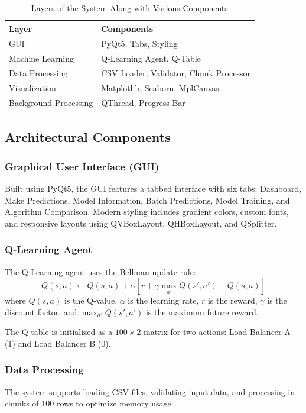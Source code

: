 \documentclass[runningheads]{llncs}
\begin{document}
\begin{table}[ht]
\caption{Layers of the System Along with Various Components}
\label{tab:layers}
\centering
\begin{tabular}{ll}
\toprule
\textbf{Layer} & \textbf{Components} \\
\midrule
GUI & PyQt5, Tabs, Styling \\
Machine Learning & Q-Learning Agent, Q-Table \\
Data Processing & CSV Loader, Validator, Chunk Processor \\
Visualization & Matplotlib, Seaborn, MplCanvas \\
Background Processing & QThread, Progress Bar \\
\bottomrule
\end{tabular}
\end{table}

\subsection{Architectural Components}
\subsubsection{Graphical User Interface (GUI)}
Built using PyQt5, the GUI features a tabbed interface with six tabs: Dashboard, Make Predictions, Model Information, Batch Predictions, Model Training, and Algorithm Comparison. Modern styling includes gradient colors, custom fonts, and responsive layouts using QVBoxLayout, QHBoxLayout, and QSplitter.

\subsubsection{Q-Learning Agent}
The Q-Learning agent uses the Bellman update rule:
\begin{equation}
Q(s, a) \leftarrow Q(s, a) + \alpha \left[ r + \gamma \max_{a'} Q(s', a') - Q(s, a) \right]
\label{eq:qlearning}
\end{equation}
where $Q(s,a)$ is the Q-value, $\alpha$ is the learning rate, $r$ is the reward, $\gamma$ is the discount factor, and $\max_{a'} Q(s',a')$ is the maximum future reward.

The Q-table is initialized as a $100 \times 2$ matrix for two actions: Load Balancer A (1) and Load Balancer B (0).

\subsubsection{Data Processing}
The system supports loading CSV files, validating input data, and processing in chunks of 100 rows to optimize memory usage.
\end{document}
